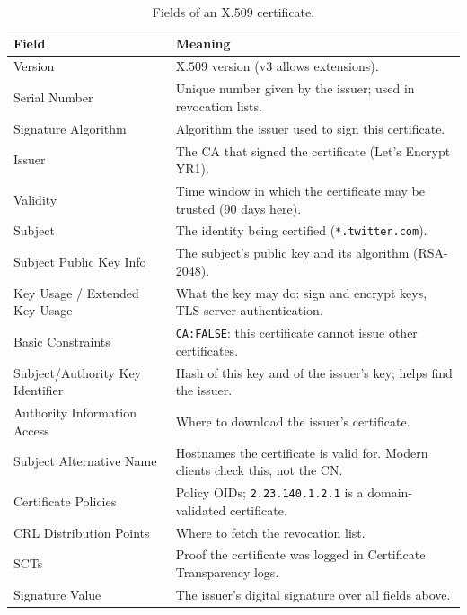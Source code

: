            \begin{table}[h]
                \centering
                \small
                \begin{tabular}{p{}p{}}
                    \toprule
                    Field & Meaning \\
                    \midrule
                    Version & X.509 version (v3 allows extensions). \\
                    Serial Number & Unique number given by the issuer; used in revocation lists. \\
                    Signature Algorithm & Algorithm the issuer used to sign this certificate. \\
                    Issuer & The CA that signed the certificate (Let's Encrypt YR1). \\
                    Validity & Time window in which the certificate may be trusted (90 days here). \\
                    Subject & The identity being certified (\texttt{*.twitter.com}). \\
                    Subject Public Key Info & The subject's public key and its algorithm (RSA-2048). \\
                    Key Usage / Extended Key Usage & What the key may do: sign and encrypt keys, TLS server authentication. \\
                    Basic Constraints & \texttt{CA:FALSE}: this certificate cannot issue other certificates. \\
                    Subject/Authority Key Identifier & Hash of this key and of the issuer's key; helps find the issuer. \\
                    Authority Information Access & Where to download the issuer's certificate. \\
                    Subject Alternative Name & Hostnames the certificate is valid for. Modern clients check this, not the CN. \\
                    Certificate Policies & Policy OIDs; \texttt{2.23.140.1.2.1} is a domain-validated certificate. \\
                    CRL Distribution Points & Where to fetch the revocation list. \\
                    SCTs & Proof the certificate was logged in Certificate Transparency logs. \\
                    Signature Value & The issuer's digital signature over all fields above. \\
                    \bottomrule
                \end{tabular}
                \caption{Fields of an X.509 certificate.}
            \end{table}

